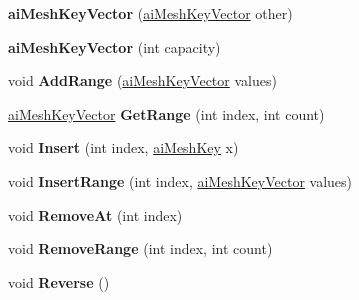 \begin{DoxyCompactItemize}
\item 
\hypertarget{classai_mesh_key_vector_acedb897de11f328796ccaf8549390a0a}{{\bfseries ai\+Mesh\+Key\+Vector} (\hyperlink{classai_mesh_key_vector}{ai\+Mesh\+Key\+Vector} other)}\label{classai_mesh_key_vector_acedb897de11f328796ccaf8549390a0a}

\item 
\hypertarget{classai_mesh_key_vector_a8f97344e72af9b94e463d78d57e19ecc}{{\bfseries ai\+Mesh\+Key\+Vector} (int capacity)}\label{classai_mesh_key_vector_a8f97344e72af9b94e463d78d57e19ecc}

\item 
\hypertarget{classai_mesh_key_vector_ac9688cdd655587d3e5825ca7fa93b12d}{void {\bfseries Add\+Range} (\hyperlink{classai_mesh_key_vector}{ai\+Mesh\+Key\+Vector} values)}\label{classai_mesh_key_vector_ac9688cdd655587d3e5825ca7fa93b12d}

\item 
\hypertarget{classai_mesh_key_vector_a3b56c7c6556b4f23d28d2d1408a162fb}{\hyperlink{classai_mesh_key_vector}{ai\+Mesh\+Key\+Vector} {\bfseries Get\+Range} (int index, int count)}\label{classai_mesh_key_vector_a3b56c7c6556b4f23d28d2d1408a162fb}

\item 
\hypertarget{classai_mesh_key_vector_a108a2b5b16b29222f732186395c814ba}{void {\bfseries Insert} (int index, \hyperlink{structai_mesh_key}{ai\+Mesh\+Key} x)}\label{classai_mesh_key_vector_a108a2b5b16b29222f732186395c814ba}

\item 
\hypertarget{classai_mesh_key_vector_a88072882fbc1a262ff16f3423fe1a807}{void {\bfseries Insert\+Range} (int index, \hyperlink{classai_mesh_key_vector}{ai\+Mesh\+Key\+Vector} values)}\label{classai_mesh_key_vector_a88072882fbc1a262ff16f3423fe1a807}

\item 
\hypertarget{classai_mesh_key_vector_a8af914b0a568fd511aa4ebd7c9dc7b43}{void {\bfseries Remove\+At} (int index)}\label{classai_mesh_key_vector_a8af914b0a568fd511aa4ebd7c9dc7b43}

\item 
\hypertarget{classai_mesh_key_vector_af48a30ae4570ca56158986713e6eb43f}{void {\bfseries Remove\+Range} (int index, int count)}\label{classai_mesh_key_vector_af48a30ae4570ca56158986713e6eb43f}

\item 
\hypertarget{classai_mesh_key_vector_a61f164b9143a8bc43eb1e92971724eed}{void {\bfseries Reverse} ()}\label{classai_mesh_key_vector_a61f164b9143a8bc43eb1e92971724eed}


\end{DoxyCompactItemize}
